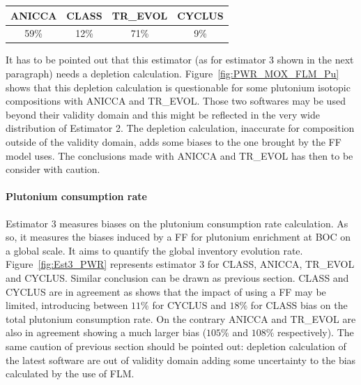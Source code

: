 \begin{table}[h]
	\begin{center}
		\begin{tabular}{|c||c||c||c|}
			\hline 
				ANICCA & CLASS & TR\_EVOL & CYCLUS \\
			\hline
				59\% & 12\% & 71\% & 9\% \\
			\hline
		\end{tabular}
	\end{center}
	\label{table:Est2_PWR}
\end{table}

It has to be pointed out that this estimator (as for estimator 3 shown in the
next paragraph) needs a depletion calculation.  Figure~\ref{fig:PWR_MOX_FLM_Pu}
shows that this depletion calculation is questionable for some plutonium
isotopic compositions with ANICCA and TR\_EVOL.  Those two softwares may be used
beyond their validity domain and this might be reflected in the very wide
distribution of Estimator 2. The depletion calculation, inaccurate for
composition outside of the validity domain, adds some biases to the one brought
by the \gls{FF} model uses. The conclusions made with ANICCA and TR\_EVOL has
then to be consider with caution.

\paragraph{Plutonium consumption rate}

Estimator 3 measures biases on the plutonium consumption rate calculation. As
so, it measures the biases induced by a \gls{FF} for plutonium enrichment at
\gls{BOC} on a global scale. It aims to quantify the global inventory evolution
rate.  Figure~\ref{fig:Est3_PWR} represents estimator 3 for CLASS, ANICCA,
TR\_EVOL and CYCLUS. Similar conclusion can be drawn as previous section. CLASS
and CYCLUS are in agreement as shows that the impact of using a \gls{FF} may be
limited, introducing between $11\%$ for CYCLUS and $18\%$ for CLASS bias on the total plutonium consumption rate. On the
contrary ANICCA and TR\_EVOL are also in agreement showing a much larger bias ($105\%$ and $108\%$ respectively).
The same caution of previous section should be pointed out: depletion
calculation of the latest software are out of validity domain adding some
uncertainty to the bias calculated by the use of \gls{FLM}.       

